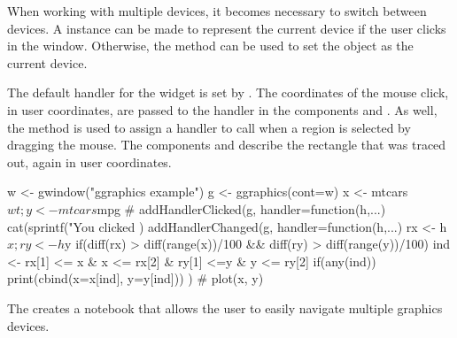 When working with multiple devices, it becomes necessary to switch
between devices. A  instance can be made to represent the
current device if the user clicks in the window. Otherwise, the
 method can be used to set the
object as the current device.

The default handler for the widget is set by
. The coordinates of the mouse
click, in user coordinates, are passed to the handler in the
components  and . As well, the method
 is used to assign a handler to
call when a region is selected by dragging the mouse. The components
 and  describe the rectangle that was traced out,
again in user coordinates.

\begin{Schunk}
\begin{Sinput}
 w <- gwindow("ggraphics example")
 g <- ggraphics(cont=w)
 x <- mtcars$wt; y <- mtcars$mpg
 #
 addHandlerClicked(g, handler=function(h,...) {
   cat(sprintf("You clicked %
 })
 addHandlerChanged(g, handler=function(h,...) {
   rx <- h$x; ry <- h$y
   if(diff(rx) > diff(range(x))/100 && 
      diff(ry) > diff(range(y))/100) {
     ind <- rx[1] <= x & x <= rx[2] & ry[1] <=y & y <= ry[2]
     if(any(ind))
       print(cbind(x=x[ind], y=y[ind]))
   }
 })
 #
 plot(x, y)
\end{Sinput}
\end{Schunk}
%

The  creates a notebook that allows the
user to easily navigate multiple graphics devices.




